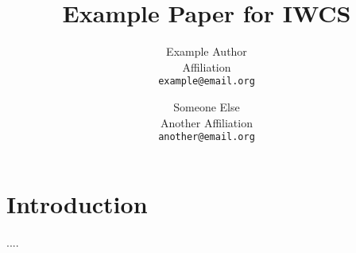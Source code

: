 \documentclass[a4paper,11pt]{article}
\title{Example Paper for IWCS}
\date{}
\author{Example Author\\
       Affiliation\\
       \texttt{example@email.org}
  \and Someone Else\\
       Another Affiliation\\
       \texttt{another@email.org}
}
\begin{document}
\maketitle
\thispagestyle{empty}
\pagestyle{empty}

\section{Introduction}

....



\end{document}
